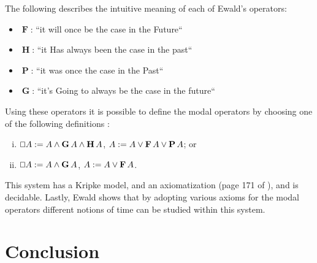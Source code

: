 \documentclass{article}
\let\Diamond\relax
\renewcommand{\Box}{\oblong}
\newcommand{\F}{\mathop{\textbf{F}}}
\renewcommand{\P}{\mathop{\textbf{P}}}
\newcommand{\G}{\mathop{\textbf{G}}}
\renewcommand{\H}{\mathop{\textbf{H}}}
\begin{document}
The following describes the intuitive meaning of each of Ewald's
operators:
\begin{itemize}
\item[] $\F$: ``it will once be the case in the Future``  
\item[] $\H$: ``it Has always been the case in the past``
\item[] $\P$: ``it was once the case in the Past``
\item[] $\G$: ``it's Going to  always be the case in the future``  
\end{itemize}


Using these operators it is possible to define the  modal
operators by choosing one of the following definitions
\cite{ewald1986}:
\begin{enumerate}[i.]
\item $\Box A := A \land \G A \land \H A$, $\Diamond A := A \lor \F A \lor \P A$; or
\item $\Box A := A \land \G A$, $\Diamond A := A \lor \F A$.
\end{enumerate}

This system has a Kripke model, and an axiomatization (page 171 of
\cite{ewald1986}), and is decidable.  Lastly, Ewald shows that by
adopting various axioms for the modal operators different notions of
time can be studied within this system.

\section{Conclusion}



\end{document}
